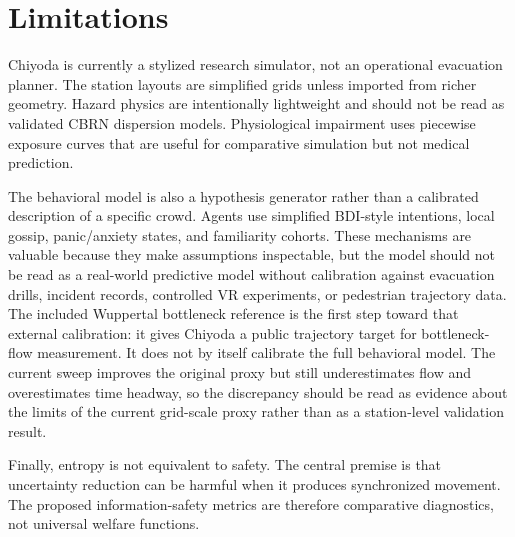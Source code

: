\section{Limitations}
\label{sec:limitations}

Chiyoda is currently a stylized research simulator, not an operational
evacuation planner. The station layouts are simplified grids unless imported
from richer geometry. Hazard physics are intentionally lightweight and should
not be read as validated CBRN dispersion models. Physiological impairment uses
piecewise exposure curves that are useful for comparative simulation but not
medical prediction.

The behavioral model is also a hypothesis generator rather than a calibrated
description of a specific crowd. Agents use simplified BDI-style intentions,
local gossip, panic/anxiety states, and familiarity cohorts. These mechanisms
are valuable because they make assumptions inspectable, but the model should not
be read as a real-world predictive model without calibration against evacuation
drills, incident records, controlled VR experiments, or pedestrian trajectory
data.
The included Wuppertal bottleneck reference is the first step toward that
external calibration: it gives Chiyoda a public trajectory target for
bottleneck-flow measurement. It does not by itself calibrate the full behavioral
model. The current sweep improves the original proxy but still underestimates
flow and overestimates time headway, so the discrepancy should be read as
evidence about the limits of the current grid-scale proxy rather than as a
station-level validation result.

Finally, entropy is not equivalent to safety. The central premise is that
uncertainty reduction can be harmful when it produces synchronized movement. The
proposed information-safety metrics are therefore comparative diagnostics, not
universal welfare functions.
